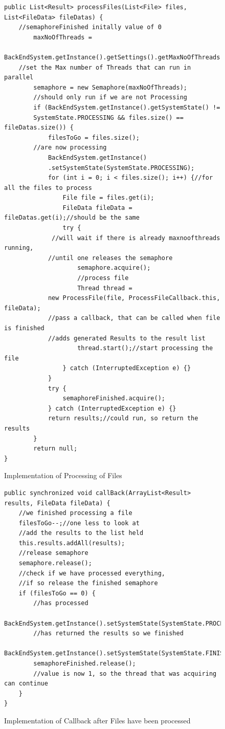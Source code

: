 \begin{figure}[h]
\begin{lstlisting}
public List<Result> processFiles(List<File> files, List<FileData> fileDatas) {
	//semaphoreFinished initally value of 0
        maxNoOfThreads = 
		BackEndSystem.getInstance().getSettings().getMaxNoOfThreads();
	//set the Max number of Threads that can run in parallel
        semaphore = new Semaphore(maxNoOfThreads);
        //should only run if we are not Processing
        if (BackEndSystem.getInstance().getSystemState() != 
		SystemState.PROCESSING && files.size() == fileDatas.size()) {
            filesToGo = files.size();
	    //are now processing
            BackEndSystem.getInstance()
			.setSystemState(SystemState.PROCESSING);
            for (int i = 0; i < files.size(); i++) {//for all the files to process
                File file = files.get(i);
                FileData fileData = fileDatas.get(i);//should be the same
                try {
		     //will wait if there is already maxnoofthreads running,
		    //until one releases the semaphore
                    semaphore.acquire();
                    //process file
                    Thread thread = 
			new ProcessFile(file, ProcessFileCallback.this, fileData);
		    //pass a callback, that can be called when file is finished
		    //adds generated Results to the result list
                    thread.start();//start processing the file
                } catch (InterruptedException e) {}
            }
            try {
                semaphoreFinished.acquire();
            } catch (InterruptedException e) {}
            return results;//could run, so return the results
        }
        return null;
}
\end{lstlisting}
\caption{Implementation of Processing of Files}
\label{fig:processingFilesImplemented}
\end{figure}
\begin{figure}[h]
\begin{lstlisting}
public synchronized void callBack(ArrayList<Result> results, FileData fileData) {
    //we finished processing a file
    filesToGo--;//one less to look at
    //add the results to the list held
    this.results.addAll(results);
    //release semaphore
    semaphore.release();
    //check if we have processed everything, 
    //if so release the finished semaphore
    if (filesToGo == 0) {
        //has processed
        BackEndSystem.getInstance().setSystemState(SystemState.PROCESSED);
        //has returned the results so we finished
        BackEndSystem.getInstance().setSystemState(SystemState.FINISHED);
        semaphoreFinished.release();
	    //value is now 1, so the thread that was acquiring can continue
    }
}
\end{lstlisting}
\caption{Implementation of Callback after Files have been processed}
\label{fig:callbackFilesImplemented}
\end{figure}
